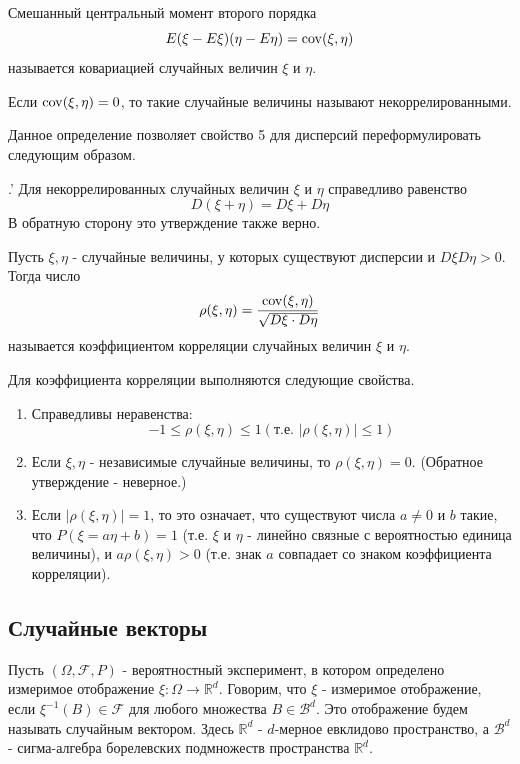 \begin{definition}[Ковариация]
	Смешанный центральный момент второго порядка
	\[ E (\xi - E\xi) (\eta - E\eta) = \operatorname{\mathop{cov}} (\xi, \eta) \]
	называется ковариацией случайных величин $\xi$ и $\eta$.
\end{definition}

\begin{definition}
	Если $\operatorname{\mathop{cov}} (\xi, \eta) = 0$, то такие случайные величины называют некоррелированными.
	
	Данное определение позволяет свойство 5 для дисперсий переформулировать следующим образом.
	
	.' Для некоррелированных случайных величин $\xi$ и $\eta$ справедливо равенство
	\[ D(\xi + \eta) = D\xi + D\eta \]
	В обратную сторону это утверждение также верно.
\end{definition}

\begin{definition}
	Пусть $\xi, \eta$ - случайные величины, у которых существуют дисперсии и $D\xi D\eta > 0$. Тогда число
	\[ \rho (\xi, \eta) = \frac{\operatorname{\mathop{cov}} (\xi, \eta)}{\sqrt{D\xi \cdot D\eta}} \]
	называется коэффициентом корреляции случайных величин $\xi$ и $\eta$.
\end{definition}

Для коэффициента корреляции выполняются следующие свойства.

\begin{enumerate}
	\item Справедливы неравенства:
	\[ -1 \le \rho (\xi, \eta) \le 1 (\text{т.е. } |\rho(\xi, \eta)| \le 1) \]
	\item Если $\xi, \eta$ - независимые случайные величины, то $\rho (\xi, \eta) = 0$. (Обратное утверждение - неверное.)
	\item Если $|\rho(\xi, \eta)| = 1$, то это означает, что существуют числа $a \ne 0$ и $b$ такие, что $P(\xi = a\eta + b) = 1$ (т.е. $\xi$ и $\eta$ - линейно связные с вероятностью единица величины), и $a \rho(\xi, \eta)>0$ (т.е. знак $a$ совпадает со знаком коэффициента корреляции).
\end{enumerate}

\subsection{Случайные векторы}

Пусть $(\Omega, \mathcal{F}, P)$ - вероятностный эксперимент, в котором определено измеримое отображение $\xi: \Omega \to \mathbb{R}^d$. Говорим, что $\xi$ - измеримое отображение, если $\xi^{-1}(B) \in \mathcal{F}$ для любого множества $B \in \mathcal{B}^d$. Это отображение будем называть случайным вектором. Здесь $\mathbb{R}^d$ - $d$-мерное евклидово пространство, а $\mathcal{B}^d$ - сигма-алгебра борелевских подмножеств пространства $\mathbb{R}^d$.

